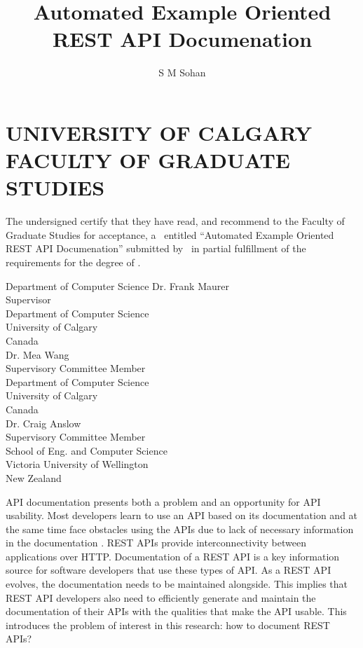 \documentclass[12pt]{ucalgthes1}
\title{Automated Example Oriented REST API Documenation}
\author{S M Sohan}
\newcommand{\thesistitle}{Automated Example Oriented REST API Documenation}
\begin{document}
\makethesistitle
{}     %
\setcounter{page}{2}
\chapter*{UNIVERSITY OF CALGARY \\ FACULTY OF GRADUATE STUDIES}
\thispagestyle{empty}
The undersigned certify that they have read, and recommend
to the Faculty of Graduate Studies for acceptance, a \Thesis\ entitled
``\thesistitle'' submitted by \Author\
in partial fulfillment of the requirements for the degree of
\Degree.\\

%
%
\begin{signing}{Department of Computer Science}
\signline
Dr. Frank Maurer \\
Supervisor\\
Department of Computer Science \\
University of Calgary \\
Canada\\
\signline
Dr. Mea Wang\\
Supervisory Committee Member\\
Department of Computer Science \\
University of Calgary \\
Canada\\
\signline
Dr. Craig Anslow\\
Supervisory Committee Member\\
School of Eng. and Computer Science \\
Victoria University of Wellington\\
New Zealand\\
\end{signing}
%
\newpage
{}
{}
API documentation presents both a problem and an opportunity for API usability. Most developers learn to use an API based on its documentation and at the same time face obstacles using the APIs due to lack of necessary information in the documentation \cite{Robillard_what_makes}. REST APIs provide interconnectivity between applications over HTTP. Documentation of a REST API is a key information source for software developers that use these types of API. As a REST API evolves, the documentation needs to be maintained alongside. This implies that REST API developers also need to efficiently generate and maintain the documentation of their APIs with the qualities that make the API usable. This introduces the problem of interest in this research: how to document REST APIs?
\end{document}
